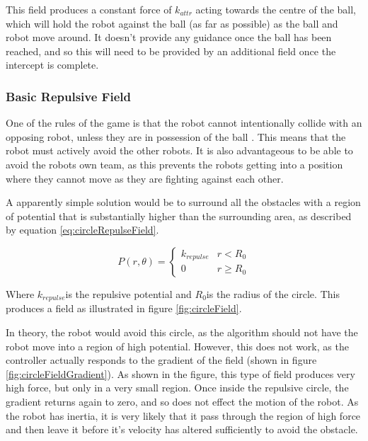 \documentclass[10pt,british,english]{article}
\begin{document}
This field produces a constant force of $k_{attr}$ acting towards the centre of the ball, which will hold the robot against the ball (as far as possible) as the ball and robot move around. It doesn't provide any guidance once the ball has been reached, and so this will need to be provided by an additional field once the intercept is complete.

\subsubsection{Basic Repulsive Field\label{sub:Basic-Repulsive-Field}}

One of the rules of the game is that the robot cannot intentionally collide with an opposing robot, unless they are in possession of the ball \cite{simurosotSim}. This means that the robot must actively avoid the other robots. It is also advantageous to be able to avoid the robots own team, as this prevents the robots getting into a position where they cannot move as they are fighting against each other.

A apparently simple solution would be to surround all the obstacles with a region of potential that is substantially higher than the surrounding area, as described by equation \ref{eq:circleRepulseField}.

\begin{equation}
P\left(r,\theta\right)=\begin{cases}
k_{repulse} & r<R_{0}\\
0 & r\geq R_{0}
\end{cases}\label{eq:circleRepulseField}
\end{equation}

Where $k_{repulse}$is the repulsive potential and $R_{0}$is the radius of the circle. This produces a field as illustrated in figure \ref{fig:circleField}.

In theory, the robot would avoid this circle, as the algorithm should not have the robot move into a region of high potential. However, this does not work, as the controller actually responds to the gradient of the field (shown in figure \ref{fig:circleFieldGradient}). As shown in the figure, this type of field produces very high force, but only in a very small region. Once inside the repulsive circle, the gradient returns again to zero, and so does not effect the motion of the robot. As the robot has inertia, it is very likely that it pass through the region of high force and then leave it before it's velocity has altered sufficiently to avoid the obstacle.
\end{document}
